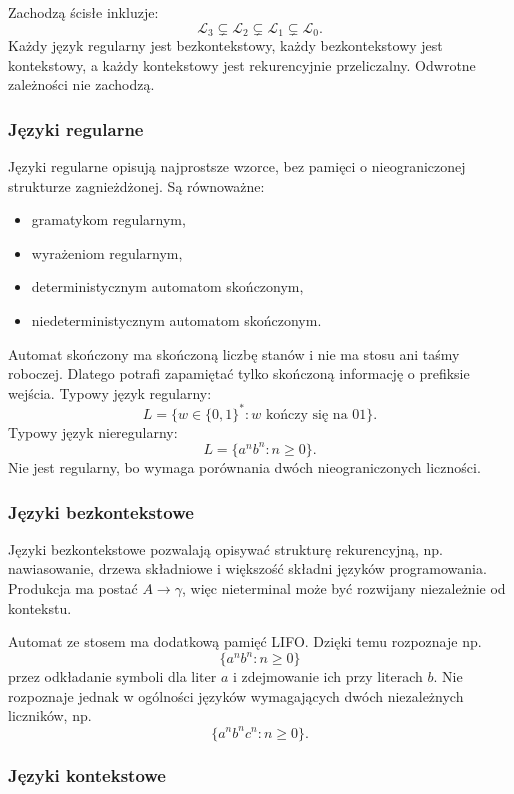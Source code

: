 Zachodzą ścisłe inkluzje:
\[
\mathcal{L}_{3}\subsetneq \mathcal{L}_{2}\subsetneq \mathcal{L}_{1}\subsetneq \mathcal{L}_{0}.
\]
Każdy język regularny jest bezkontekstowy, każdy bezkontekstowy jest kontekstowy, a każdy kontekstowy jest rekurencyjnie przeliczalny. Odwrotne zależności nie zachodzą.

\subsubsection{Języki regularne}

Języki regularne opisują najprostsze wzorce, bez pamięci o nieograniczonej strukturze zagnieżdżonej. Są równoważne:
\begin{itemize}
  \item gramatykom regularnym,
  \item wyrażeniom regularnym,
  \item deterministycznym automatom skończonym,
  \item niedeterministycznym automatom skończonym.
\end{itemize}

Automat skończony ma skończoną liczbę stanów i nie ma stosu ani taśmy roboczej. Dlatego potrafi zapamiętać tylko skończoną informację o prefiksie wejścia. Typowy język regularny:
\[
L=\{w\in\{0,1\}^*: w\text{ kończy się na }01\}.
\]
Typowy język nieregularny:
\[
L=\{a^n b^n:n\ge 0\}.
\]
Nie jest regularny, bo wymaga porównania dwóch nieograniczonych liczności.

\subsubsection{Języki bezkontekstowe}

Języki bezkontekstowe pozwalają opisywać strukturę rekurencyjną, np. nawiasowanie, drzewa składniowe i większość składni języków programowania. Produkcja ma postać $A\to\gamma$, więc nieterminal może być rozwijany niezależnie od kontekstu.

Automat ze stosem ma dodatkową pamięć LIFO. Dzięki temu rozpoznaje np.
\[
\{a^n b^n:n\ge 0\}
\]
przez odkładanie symboli dla liter $a$ i zdejmowanie ich przy literach $b$. Nie rozpoznaje jednak w ogólności języków wymagających dwóch niezależnych liczników, np.
\[
\{a^n b^n c^n:n\ge 0\}.
\]

\subsubsection{Języki kontekstowe}

